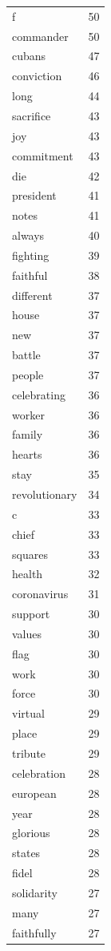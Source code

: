 \begin{tabular}{lr}
f & 50 \\
commander & 50 \\
cubans & 47 \\
conviction & 46 \\
long & 44 \\
sacrifice & 43 \\
joy & 43 \\
commitment & 43 \\
die & 42 \\
president & 41 \\
notes & 41 \\
always & 40 \\
fighting & 39 \\
faithful & 38 \\
different & 37 \\
house & 37 \\
new & 37 \\
battle & 37 \\
people & 37 \\
celebrating & 36 \\
worker & 36 \\
family & 36 \\
hearts & 36 \\
stay & 35 \\
revolutionary & 34 \\
c & 33 \\
chief & 33 \\
squares & 33 \\
health & 32 \\
coronavirus & 31 \\
support & 30 \\
values & 30 \\
flag & 30 \\
work & 30 \\
force & 30 \\
virtual & 29 \\
place & 29 \\
tribute & 29 \\
celebration & 28 \\
european & 28 \\
year & 28 \\
glorious & 28 \\
states & 28 \\
fidel & 28 \\
solidarity & 27 \\
many & 27 \\
faithfully & 27 \\

\end{tabular}
